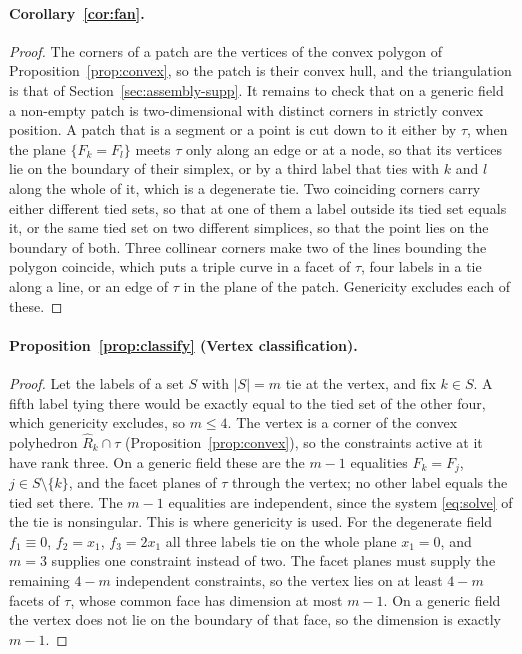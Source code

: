 \documentclass[11pt]{article}
\theoremstyle{definition}
\newcommand{\tet}{\tau}
\newcommand{\interp}{F}
\newcommand{\dregion}[1]{\widehat{R}_{#1}}
\begin{document}
\paragraph*{Corollary~\ref{cor:fan}.}
\begin{proof}
The corners of a patch are the vertices of the convex polygon of
Proposition~\ref{prop:convex}, so the patch is their convex hull, and the
triangulation is that of Section~\ref{sec:assembly-supp}. It remains to
check that on a generic field a non-empty patch is two-dimensional with
distinct corners in strictly convex position. A patch that is a segment or a
point is cut down to it either by $\tet$, when the plane
$\{\interp_k=\interp_l\}$ meets $\tet$ only along an edge or at a node, so
that its vertices lie on the boundary of their simplex, or by a third label
that ties with $k$ and $l$ along the whole of it, which is a degenerate tie.
Two coinciding corners carry either different tied sets, so that at one of
them a label outside its tied set equals it, or the same tied set on two
different simplices, so that the point lies on the boundary of both. Three
collinear corners make two of the lines bounding the polygon coincide, which
puts a triple curve in a facet of $\tet$, four labels in a tie along a line,
or an edge of $\tet$ in the plane of the patch. Genericity excludes each of
these.
\end{proof}

\paragraph*{Proposition~\ref{prop:classify} (Vertex classification).}
\begin{proof}
Let the labels of a set $S$ with $|S| = m$ tie at the vertex, and fix
$k \in S$. A fifth label tying there would be exactly equal to the tied set
of the other four, which genericity excludes, so $m \le 4$. The vertex is a
corner of the convex polyhedron $\dregion{k}\cap\tet$
(Proposition~\ref{prop:convex}), so the constraints active at it have rank
three. On a generic field these are the $m-1$ equalities
$\interp_k = \interp_j$, $j \in S\setminus\{k\}$, and the facet planes of
$\tet$ through the vertex; no other label equals the tied set there. The
$m-1$ equalities are independent, since the system \eqref{eq:solve} of the
tie is nonsingular. This is where genericity is used. For the degenerate
field $f_1 \equiv 0$, $f_2 = x_1$, $f_3 = 2x_1$ all three labels tie on the
whole plane $x_1 = 0$, and $m = 3$ supplies one constraint instead of two.
The facet planes must supply the remaining $4-m$ independent constraints, so
the vertex lies on at least $4-m$ facets of $\tet$, whose common face has
dimension at most $m-1$. On a generic field the vertex does not lie on the
boundary of that face, so the dimension is exactly $m-1$.
\end{proof}
\end{document}
